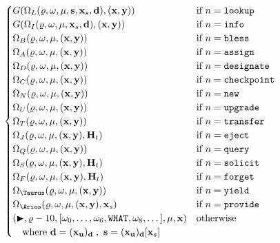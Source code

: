\begin{align}
\begin{cases}
    G(\Omega_L(\gascounter, \registers, \memory, \mathbf{s}, \mathbf{x}_s, \mathbf{d}), (\mathbf{x}, \mathbf{y})) &\when n = \mathtt{lookup} \\
    G(\Omega_I(\gascounter, \registers, \memory, \mathbf{x}_s, \mathbf{d}), (\mathbf{x}, \mathbf{y})) &\when n = \mathtt{info} \\
    \Omega_B(\gascounter, \registers, \memory, (\mathbf{x}, \mathbf{y})) &\when n = \mathtt{bless}\\
    \Omega_A(\gascounter, \registers, \memory, (\mathbf{x}, \mathbf{y})) &\when n = \mathtt{assign}\\
    \Omega_D(\gascounter, \registers, \memory, (\mathbf{x}, \mathbf{y})) &\when n = \mathtt{designate}\\
    \Omega_C(\gascounter, \registers, \memory, (\mathbf{x}, \mathbf{y})) &\when n = \mathtt{checkpoint} \\
    \Omega_N(\gascounter, \registers, \memory, (\mathbf{x}, \mathbf{y})) &\when n = \mathtt{new} \\
    \Omega_U(\gascounter, \registers, \memory, (\mathbf{x}, \mathbf{y})) &\when n = \mathtt{upgrade} \\
    \Omega_T(\gascounter, \registers, \memory, (\mathbf{x}, \mathbf{y})) &\when n = \mathtt{transfer} \\
    \Omega_J(\gascounter, \registers, \memory, (\mathbf{x}, \mathbf{y}), \mathbf{H}_t) &\when n = \mathtt{eject} \\
    \Omega_Q(\gascounter, \registers, \memory, (\mathbf{x}, \mathbf{y})) &\when n = \mathtt{query} \\
    \Omega_S(\gascounter, \registers, \memory, (\mathbf{x}, \mathbf{y}), \mathbf{H}_t) &\when n = \mathtt{solicit} \\
    \Omega_F(\gascounter, \registers, \memory, (\mathbf{x}, \mathbf{y}), \mathbf{H}_t) &\when n = \mathtt{forget} \\
    \Omega_\Taurus(\gascounter, \registers, \memory, (\mathbf{x}, \mathbf{y})) &\when n = \mathtt{yield} \\
    \Omega_\Aries(\gascounter, \registers, \memory, (\mathbf{x}, \mathbf{y}), \mathbf{x}_s) &\when n = \mathtt{provide} \\
    (\continue, \gascounter - 10, [\registers_0, \dots, \registers_6, \mathtt{WHAT}, \registers_8, \dots], \memory, \mathbf{x}) &\otherwise\\
    \quad \where \mathbf{d} = (\mathbf{x}_\mathbf{u})_\mathbf{d}\;,\ \mathbf{s} = (\mathbf{x}_\mathbf{u})_\mathbf{d}[\mathbf{x}_s]\!\!\!\!\!\!\!\!\!\!\!\!\!\!\!\!\!& \\

\end{cases}
\end{align}
